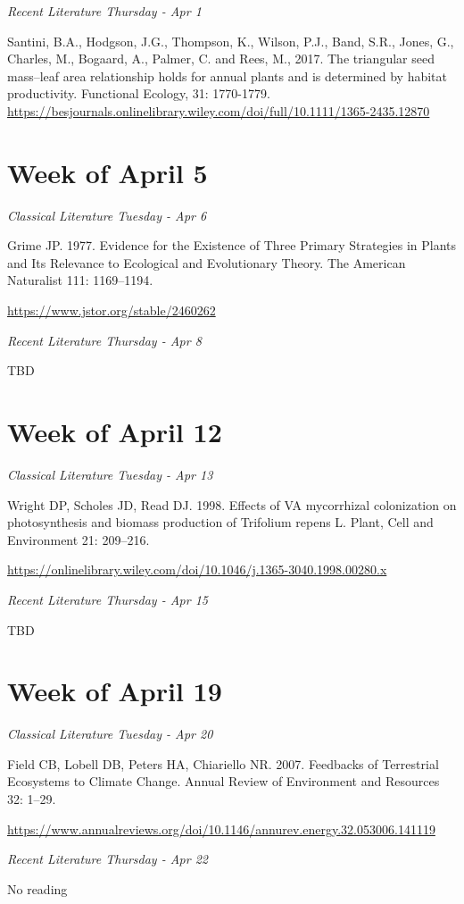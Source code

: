 \documentclass[12pt, notitlepage]{article}   	%
\begin{document}
{\textit{Recent Literature Thursday - Apr 1} \par
Santini, B.A., Hodgson, J.G., Thompson, K., Wilson, P.J., Band, S.R., Jones, G., 
Charles, M., Bogaard, A., Palmer, C. and Rees, M., 2017. 
The triangular seed mass–leaf area relationship holds for annual plants and is determined by habitat productivity. 
Functional Ecology, 31: 1770-1779.
\url{https://besjournals.onlinelibrary.wiley.com/doi/full/10.1111/1365-2435.12870}

\section*{Week of April 5}
\textit{Classical Literature Tuesday - Apr 6} \par
Grime JP. 1977. Evidence for the Existence of Three Primary Strategies in Plants and Its 
Relevance to Ecological and Evolutionary Theory. 
The American Naturalist 111: 1169–1194. \par
\url{https://www.jstor.org/stable/2460262}

\textit{Recent Literature Thursday - Apr 8} \par
TBD

\section*{Week of April 12}
\textit{Classical Literature Tuesday - Apr 13} \par
Wright DP, Scholes JD, Read DJ. 1998. Effects of VA mycorrhizal colonization on 
photosynthesis and biomass production of Trifolium repens L. 
Plant, Cell and Environment 21: 209–216. \par
\url{https://onlinelibrary.wiley.com/doi/10.1046/j.1365-3040.1998.00280.x}

\textit{Recent Literature Thursday - Apr 15} \par
TBD

\section*{Week of April 19}
\textit{Classical Literature Tuesday - Apr 20} \par
Field CB, Lobell DB, Peters HA, Chiariello NR. 2007. Feedbacks of Terrestrial Ecosystems 
to Climate Change. Annual Review of Environment and Resources 32: 1–29. \par
\url{https://www.annualreviews.org/doi/10.1146/annurev.energy.32.053006.141119}

\textit{Recent Literature Thursday - Apr 22} \par
No reading \par

}
\end{document}
